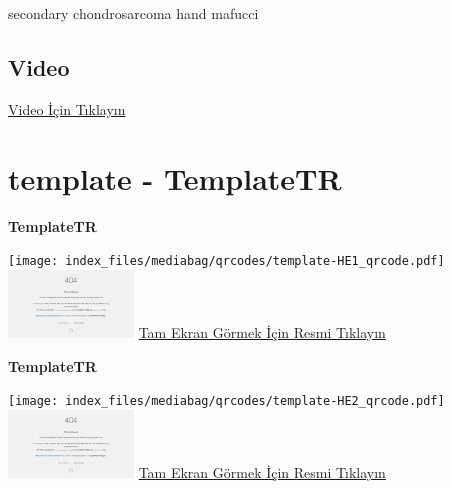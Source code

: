 \documentclass[
  letterpaper,
  DIV=11,
  numbers=noendperiod]{scrreprt}
\begin{document}
\begin{tcolorbox}[enhanced jigsaw, breakable, opacitybacktitle=0.6, arc=.35mm, colbacktitle=quarto-callout-tip-color!10!white, colback=white, toptitle=1mm, left=2mm, opacityback=0, colframe=quarto-callout-tip-color-frame, titlerule=0mm, rightrule=.15mm, bottomrule=.15mm, toprule=.15mm, bottomtitle=1mm, title=\textcolor{quarto-callout-tip-color}{\faLightbulb}\hspace{0.5em}{Tanı}, coltitle=black, leftrule=.75mm]

secondary chondrosarcoma hand mafucci

\end{tcolorbox}

\hypertarget{video-32}{%
\subsection{Video}\label{video-32}}

\href{https://www.youtube.com/watch?v=iWDCr1XysLk}{Video İçin Tıklayın}

\hypertarget{sec-template}{%
\section{template - TemplateTR}\label{sec-template}}

\textbf{TemplateTR}

\texttt{[image: index\_files/mediabag/qrcodes/template-HE1\_qrcode.pdf]}
\href{https://images.patolojiatlasi.com/template/HE1.html}{\includegraphics[width=0.25\textwidth,height=\textheight]{./screenshots/thumbnail_template-HE1.png}}
\href{https://images.patolojiatlasi.com/template/HE1.html}{Tam Ekran
Görmek İçin Resmi Tıklayın}

\textbf{TemplateTR}

\texttt{[image: index\_files/mediabag/qrcodes/template-HE2\_qrcode.pdf]}
\href{https://images.patolojiatlasi.com/template/HE2.html}{\includegraphics[width=0.25\textwidth,height=\textheight]{./screenshots/thumbnail_template-HE2.png}}
\href{https://images.patolojiatlasi.com/template/HE2.html}{Tam Ekran
Görmek İçin Resmi Tıklayın}
\end{document}

